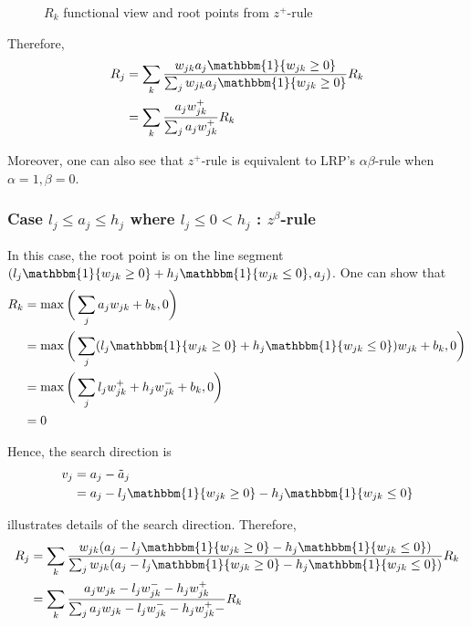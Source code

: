 \begin{figure}[!htb]
\centering
{}
\caption{$R_k$ functional view and root points from $z^+$-rule}
\label{fig:zplus_rule_cases}
\end{figure}



Therefore, 
\begin{align*}
		R_j &=	\sum_k \frac{ w_{jk} a_j \mathbbm{1}\{ w_{jk}  \ge 0 \}  }{\sum_{j} w_{jk} a_j \mathbbm{1}\{ w_{jk}  \ge 0 \} }  R_k\\
		&=	\sum_k  \frac{ a_j  w_{jk}^+   }{\sum_{j}  a_j w_{jk}^+  }  R_k
\end{align*}

Moreover, one can also see that $z^+$-rule is equivalent to LRP's $\alpha\beta$-rule when $\alpha=1, \beta=0$. 


\subsubsection{Case $l_j \le a_j \le h_j$ where $l_j \le 0 < h_j $ : $z^\beta$-rule}
In this case, the root point is on the line segment $( l_j \mathbbm{1}\{ w_{jk}  \ge 0 \}  + h_j \mathbbm{1}\{ w_{jk}  \le 0 \}  , a_j ) $. One can show that 
\begin{align}
R_k &= \max \bigg( \sum_j a_j w_{jk } + b_k, 0 \bigg) \\
&=\max \bigg( \sum_j (l_j \mathbbm{1}\{ w_{jk}  \ge 0 \}  + h_j \mathbbm{1}\{ w_{jk}  \le 0 \} ) w_{jk } + b_k, 0 \bigg) \\
&= \max \bigg( \sum_j l_j w_{jk }^+   + h_j w_{jk }^-  + b_k, 0 \bigg) \\
&= 0
\end{align}

Hence,  the search direction is 
\begin{align*}
	v_j &= a_j - \tilde{a}_j \\
	&=a_j  - l_j \mathbbm{1}\{ w_{jk}  \ge 0 \}  - h_j \mathbbm{1}\{ w_{jk}  \le 0 \}
\end{align*}

\addfigure{\ref{fig:zbeta_rule_cases}} illustrates details of the search direction. Therefore, 
\begin{align*}
		R_j &=	\sum_k \frac{ w_{jk}  (a_j  - l_j \mathbbm{1}\{ w_{jk}  \ge 0 \}  - h_j \mathbbm{1}\{ w_{jk}  \le 0 \}) }{\sum_{j} w_{jk}  (a_j  - l_j \mathbbm{1}\{ w_{jk}  \ge 0 \}  - h_j \mathbbm{1}\{ w_{jk}  \le 0 \}) }  R_k\\
		&=	\sum_k  \frac{ a_j  w_{jk} - l_j w_{jk}^- - h_j w_{jk}^+  }{\sum_{j}   a_j  w_{jk} - l_j w_{jk}^- - h_j w_{jk}^+  -}  R_k
\end{align*}

